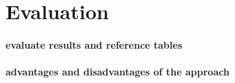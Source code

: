 \section{Evaluation} \label{evaluation}

\paragraph*{evaluate results and reference tables}
\paragraph*{advantages and disadvantages of the approach}
